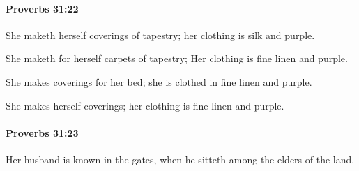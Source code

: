 		\paragraph{Proverbs 31:22} %
			\label{PROVERBS-31-22}

			She maketh herself coverings of tapestry; her clothing is silk and purple.

			\begin{versebox}
					\item[BHS] 
					\item[ASV] She maketh for herself carpets of tapestry; Her clothing is fine linen and purple.
					\item[NIV] She makes coverings for her bed; she is clothed in fine linen and purple.
					\item[NRSV] She makes herself coverings; her clothing is fine linen and purple.
			\end{versebox}

		\paragraph{Proverbs 31:23} %
			\label{PROVERBS-31-23}

			Her husband is known in the gates, when he sitteth among the elders of the land.

